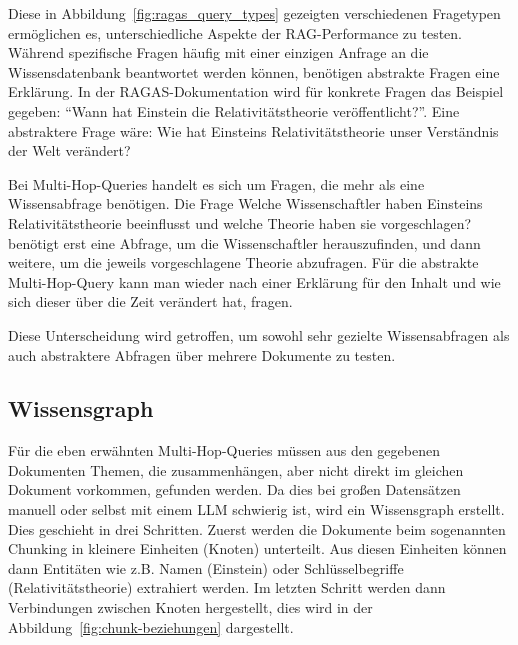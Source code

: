 Diese in Abbildung~\ref{fig:ragas_query_types} gezeigten verschiedenen Fragetypen ermöglichen es, unterschiedliche Aspekte der RAG-Performance zu testen.
Während spezifische Fragen häufig mit einer einzigen Anfrage an die Wissensdatenbank beantwortet werden können, benötigen abstrakte Fragen eine Erklärung.
In der RAGAS-Dokumentation \cite{ragas_query_types} wird für konkrete Fragen das Beispiel gegeben: \enquote{Wann hat Einstein die Relativitätstheorie veröffentlicht?}.
Eine abstraktere Frage wäre: \glqq Wie hat Einsteins Relativitätstheorie unser Verständnis der Welt verändert?\grqq{}

Bei Multi-Hop-Queries handelt es sich um Fragen, die mehr als eine Wissensabfrage benötigen. Die Frage \glqq Welche Wissenschaftler haben Einsteins Relativitätstheorie beeinflusst und welche Theorie haben sie vorgeschlagen?\grqq{} benötigt erst eine Abfrage, um die Wissenschaftler herauszufinden, und dann weitere, um die jeweils vorgeschlagene Theorie abzufragen.
Für die abstrakte Multi-Hop-Query kann man wieder nach einer Erklärung für den Inhalt und wie sich dieser über die Zeit verändert hat, fragen.

Diese Unterscheidung wird getroffen, um sowohl sehr gezielte Wissensabfragen als auch abstraktere Abfragen über mehrere Dokumente zu testen.

\subsection{Wissensgraph}

Für die eben erwähnten Multi-Hop-Queries müssen aus den gegebenen Dokumenten Themen, die zusammenhängen, aber nicht direkt im gleichen Dokument vorkommen, gefunden werden.
Da dies bei großen Datensätzen manuell oder selbst mit einem LLM schwierig ist, wird ein Wissensgraph erstellt. \\
Dies geschieht in drei Schritten. Zuerst werden die Dokumente beim sogenannten Chunking in kleinere Einheiten (Knoten) unterteilt.
Aus diesen Einheiten können dann Entitäten wie z.B. Namen (Einstein) oder Schlüsselbegriffe (Relativitätstheorie) extrahiert werden.
Im letzten Schritt werden dann Verbindungen zwischen Knoten hergestellt, dies wird in der Abbildung~\ref{fig:chunk-beziehungen} dargestellt.

